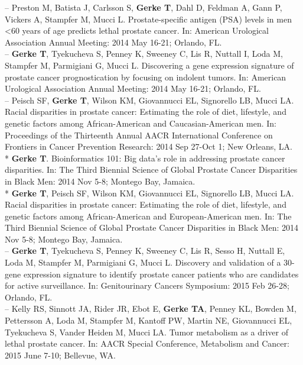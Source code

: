 \documentclass[11pt, a4paper]{article} %
\begin{document}
-- Preston M, Batista J, Carlsson S, {\bf Gerke T}, Dahl D, Feldman A, Gann P, Vickers A, Stampfer M, Mucci L. Prostate-specific antigen (PSA) levels in men <60 years of age predicts lethal prostate cancer. In: American Urological Association Annual Meeting: 2014 May 16-21; Orlando, FL.\\

-- {\bf Gerke T}, Tyekucheva S, Penney K, Sweeney C, Lis R, Nuttall I, Loda M, Stampfer M, Parmigiani G, Mucci L. Discovering a gene expression signature of prostate cancer prognostication by focusing on indolent tumors. In: American Urological Association Annual Meeting: 2014 May 16-21; Orlando, FL.\\

-- Peisch SF, {\bf Gerke T}, Wilson KM, Giovannucci EL, Signorello LB, Mucci LA. Racial disparities in prostate cancer: Estimating the role of diet, lifestyle, and genetic factors among African-American and Caucasian-American men. In: Proceedings of the Thirteenth Annual AACR International Conference on Frontiers in Cancer Prevention Research: 2014 Sep 27-Oct 1; New Orleans, LA.\\

* {\bf Gerke T}. Bioinformatics 101: Big data's role in addressing prostate cancer disparities. In: The Third Biennial Science of Global Prostate Cancer Disparities in Black Men: 2014 Nov 5-8; Montego Bay, Jamaica.\\

* {\bf Gerke T}, Peisch SF, Wilson KM, Giovannucci EL, Signorello LB, Mucci LA. Racial disparities in prostate cancer: Estimating the role of diet, lifestyle, and genetic factors among African-American and European-American men. In: The Third Biennial Science of Global Prostate Cancer Disparities in Black Men: 2014 Nov 5-8; Montego Bay, Jamaica.\\

-- {\bf Gerke T}, Tyekucheva S, Penney K, Sweeney C, Lis R, Sesso H, Nuttall E, Loda M, Stampfer M, Parmigiani G, Mucci L. Discovery and validation of a 30-gene expression signature to identify prostate cancer patients who are candidates for active surveillance. In: Genitourinary Cancers Symposium: 2015 Feb 26-28; Orlando, FL.\\

-- Kelly RS, Sinnott JA, Rider JR, Ebot E, {\bf Gerke TA}, Penney KL, Bowden M, Pettersson A, Loda M, Stampfer M, Kantoff PW, Martin NE, Giovannucci EL, Tyekucheva S, Vander Heiden M, Mucci LA. Tumor metabolism as a driver of lethal prostate cancer. In: AACR Special Conference, Metabolism and Cancer: 2015 June 7-10; Bellevue, WA.\\
\end{document}
